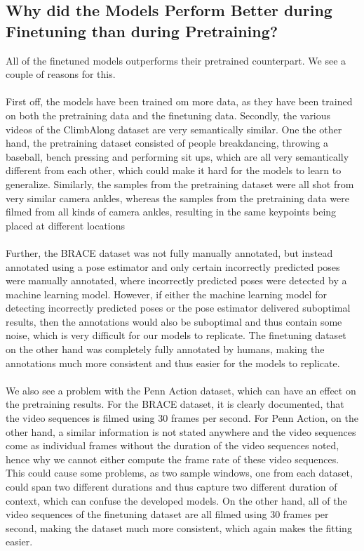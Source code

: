 \documentclass[./main.tex]{subfiles}
\begin{document}
\subsection{Why did the Models Perform Better during Finetuning than during Pretraining?}
\label{sec:pretrain_vs_finetune}
All of the finetuned models outperforms their pretrained counterpart. We see a couple of reasons for this. 
\\
\\
First off, the models have been trained om more data, as they have been trained on both the pretraining data and the finetuning data. Secondly, the various videos of the ClimbAlong dataset are very semantically similar. One the other hand, the pretraining dataset consisted of people breakdancing, throwing a baseball, bench pressing and performing sit ups, which are all very semantically different from each other, which could make it hard for the models to learn to generalize. Similarly, the samples from the pretraining dataset were all shot from very similar camera ankles, whereas the samples from the pretraining data were filmed from all kinds of camera ankles, resulting in the same keypoints being placed at different locations
\\
\\
Further, the BRACE dataset was not fully manually annotated, but instead annotated using a pose estimator and only certain incorrectly predicted poses were manually annotated, where incorrectly predicted poses were detected by a machine learning model. However, if either the machine learning model for detecting incorrectly predicted poses or the pose estimator delivered suboptimal results, then the annotations would also be suboptimal and thus contain some noise, which is very difficult for our models to replicate. The finetuning dataset on the other hand was completely fully annotated by humans, making the annotations much more consistent and thus easier for the models to replicate.
\\
\\
We also see a problem with the Penn Action dataset, which can have an effect on the pretraining results. For the BRACE dataset, it is clearly documented, that the video sequences is filmed using 30 frames per second. For Penn Action, on the other hand, a similar information is not stated anywhere and the video sequences come as individual frames without the duration of the video sequences noted, hence why we cannot either compute the frame rate of these video sequences. This could cause some problems, as two sample windows, one from each dataset, could span two different durations and thus capture two different duration of context, which can confuse the developed models. On the other hand, all of the video sequences of the finetuning dataset are all filmed using 30 frames per second, making the dataset much more consistent, which again makes the fitting easier.
\end{document}
